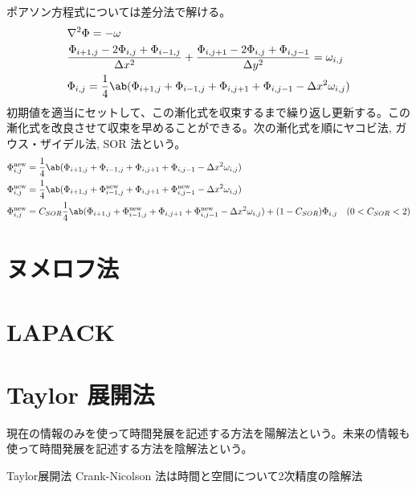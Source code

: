 \documentclass[uplatex,diffipdfmx,a4paper,11pt]{jlreq}
\begin{document}
\begin{theorem}
  ポアソン方程式については差分法で解ける。
  \begin{align}
     & \nabla^2\Phi = - \omega                                                                                                                    \\
     & \frac{\Phi_{i+1,j} - 2\Phi_{i,j} + \Phi_{i-1,j}}{\Delta x^2} + \frac{\Phi_{i,j+1} - 2\Phi_{i,j} + \Phi_{i,j-1}}{\Delta y^2} = \omega_{i,j} \\
     & \Phi_{i,j} = \frac{1}{4}\ab(\Phi_{i+1,j} + \Phi_{i-1,j} + \Phi_{i,j+1} + \Phi_{i,j-1} - \Delta x^2\omega_{i,j})
  \end{align}
  初期値を適当にセットして、この漸化式を収束するまで繰り返し更新する。この漸化式を改良させて収束を早めることができる。次の漸化式を順にヤコビ法, ガウス・ザイデル法, SOR 法という。
  \begin{align}
    \Phi_{i,j}^{\mathrm{new}} & = \frac{1}{4}\ab(\Phi_{i+1,j} + \Phi_{i-1,j} + \Phi_{i,j+1} + \Phi_{i,j-1} - \Delta x^2\omega_{i,j})                                                                                    \\
    \Phi_{i,j}^{\mathrm{new}} & = \frac{1}{4}\ab(\Phi_{i+1,j} + \Phi_{i-1,j}^{\mathrm{new}} + \Phi_{i,j+1} + \Phi_{i,j-1}^{\mathrm{new}} - \Delta x^2\omega_{i,j})                                                      \\
    \Phi_{i,j}^{\mathrm{new}} & = C_{SOR}\frac{1}{4}\ab(\Phi_{i+1,j} + \Phi_{i-1,j}^{\mathrm{new}} + \Phi_{i,j+1} + \Phi_{i,j-1}^{\mathrm{new}} - \Delta x^2\omega_{i,j}) + (1 - C_{SOR})\Phi_{i,j} & (0 < C_{SOR} < 2)
  \end{align}
\end{theorem}

\section{ヌメロフ法}
\section{LAPACK}
\section{Taylor 展開法}
\begin{definition}
  現在の情報のみを使って時間発展を記述する方法を陽解法という。未来の情報も使って時間発展を記述する方法を陰解法という。
\end{definition}
\begin{definition}
  Taylor展開法
  Crank-Nicolson 法は時間と空間について2次精度の陰解法
\end{definition}
\end{document}
